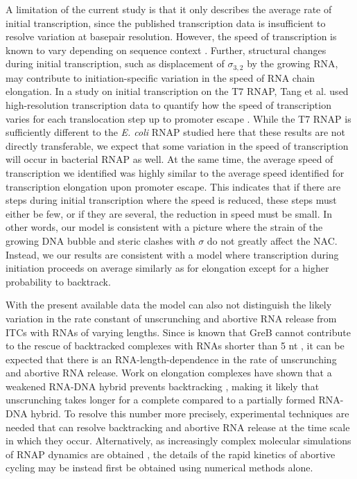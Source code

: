 A limitation of the current study is that it only describes the average rate
of initial transcription, since the published transcription data is
insufficient to resolve variation at basepair resolution. However, the speed
of transcription is known to vary depending on sequence context
\cite{bai_mechanochemical_2007,malinen_active_2012}. Further, structural
changes during initial transcription, such as displacement of $\sigma_{3,2}$
by the growing RNA, may contribute to initiation-specific variation in the
speed of RNA chain elongation. In a study on initial transcription on the T7
RNAP, Tang et al. used high-resolution transcription data to quantify how the
speed of transcription varies for each translocation step up to promoter
escape \cite{tang_real-time_2009}. While the T7 RNAP is sufficiently different
to the \textit{E. coli} RNAP studied here that these results are not directly
transferable, we expect that some variation in the speed of transcription will
occur in bacterial RNAP as well. At the same time, the average speed of
transcription we identified was highly similar to the average speed identified
for transcription elongation upon promoter escape. This indicates that if
there are steps during initial transcription where the speed is reduced, these
steps must either be few, or if they are several, the reduction in speed must
be small. In other words, our model is consistent with a picture where the
strain of the growing DNA bubble and steric clashes with $\sigma$ do not
greatly affect the NAC. Instead, we our results are consistent with a model
where transcription during initiation proceeds on average similarly as for
elongation except for a higher probability to backtrack.

With the present available data the model can also not distinguish the likely
variation in the rate constant of unscrunching and abortive RNA release from
ITCs with RNAs of varying lengths. Since is known that GreB cannot contribute to
the rescue of backtracked complexes with RNAs shorter than 5 nt
\cite{hsu_initial_2006}, it can be expected that there is an
RNA-length-dependence in the rate of unscrunching and abortive RNA release.
Work on elongation complexes have shown that a weakened RNA-DNA hybrid
prevents backtracking \cite{nudler_rnadna_1997}, making it likely that
unscrunching takes longer for a complete compared to a partially formed
RNA-DNA hybrid. To resolve this number more precisely, experimental techniques
are needed that can resolve backtracking and abortive RNA release at the time
scale in which they occur. Alternatively, as increasingly complex molecular
simulations of RNAP dynamics are obtained \cite{silva_millisecond_2014}, the
details of the rapid kinetics of abortive cycling may be instead first be
obtained using numerical methods alone.


